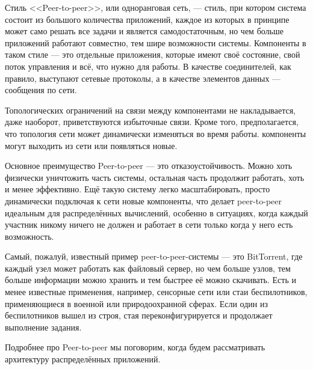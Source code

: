 \documentclass{../../text-style}
\begin{document}
Стиль <<Peer-to-peer>>, или одноранговая сеть, --- стиль, при котором система состоит из большого количества приложений, каждое из которых в принципе может само решать все задачи и является самодостаточным, но чем больше приложений работают совместно, тем шире возможности системы. Компоненты в таком стиле --- это отдельные приложения, которые имеют своё состояние, свой поток управления и всё, что нужно для работы. В качестве соединителей, как правило, выступают сетевые протоколы, а в качестве элементов данных --- сообщения по сети. 

Топологических ограничений на связи между компонентами не накладывается, даже наоборот, приветствуются избыточные связи. Кроме того, предполагается, что топология сети может динамически изменяться во время работы. компоненты могут выходить из сети или появляться новые.

Основное преимущество Peer-to-peer --- это отказоустойчивость. Можно хоть физически уничтожить часть системы, остальная часть продолжит работать, хоть и менее эффективно. Ещё такую систему легко масштабировать, просто динамически подключая к сети новые компоненты, что делает peer-to-peer идеальным для распределённых вычислений, особенно в ситуациях, когда каждый участник никому ничего не должен и работает в сети только когда у него есть возможность.

Самый, пожалуй, известный пример peer-to-peer-системы --- это BitTorrent, где каждый узел может работать как файловый сервер, но чем больше узлов, тем больше информации можно хранить и тем быстрее её можно скачивать. Есть и менее известные применения, например, сенсорные сети или стаи беспилотников, применяющиеся в военной или природоохранной сферах. Если один из беспилотников вышел из строя, стая переконфигурируется и продолжает выполнение задания.

Подробнее про Peer-to-peer мы поговорим, когда будем рассматривать архитектуру распределённых приложений.
\end{document}
